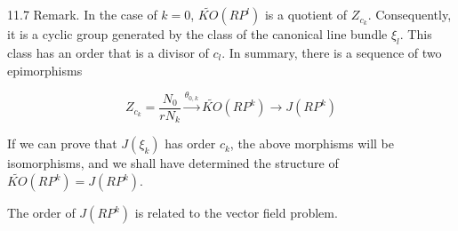 11.7 Remark. In the case of $k = 0$, $\tilde{KO}(RP^l)$ is a quotient of $Z_{c_k}$. Consequently, it is a cyclic group generated by the class of the canonical line bundle $\xi_l$. This class has an order that is a divisor of $c_l$. In summary, there is a sequence of two epimorphisms

$$Z_{c_k} = \frac{N_0}{rN_k} \xrightarrow{\theta_{0,k}} \tilde{KO}(RP^k) \longrightarrow J(RP^k)$$

If we can prove that $J(\xi_k)$ has order $c_k$, the above morphisms will be isomorphisms, and we shall have determined the structure of $\tilde{KO}(RP^k) = J(RP^k)$.

The order of $J(RP^k)$ is related to the vector field problem.
